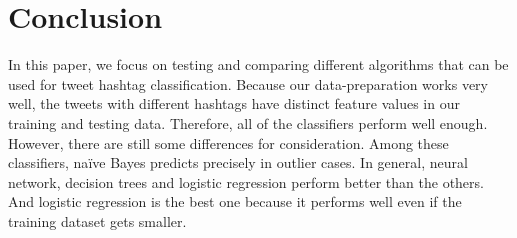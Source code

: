 \documentclass[letterpaper,11pt,twocolumn]{article}
\begin{document}


\section{Conclusion}
\label{sec:conc}
In this paper, we focus on testing and comparing different algorithms that can be used for tweet hashtag classification. Because our data-preparation works very well, the tweets with different hashtags have distinct feature values in our training and testing data. Therefore, all of the classifiers perform well enough. However, there are still some differences for consideration. Among these classifiers, na{\"i}ve Bayes predicts precisely in outlier cases. In general, neural network, decision trees and logistic regression perform better than the others. And logistic regression is the best one because it performs well even if the training dataset gets smaller.

% 


\end{document}
